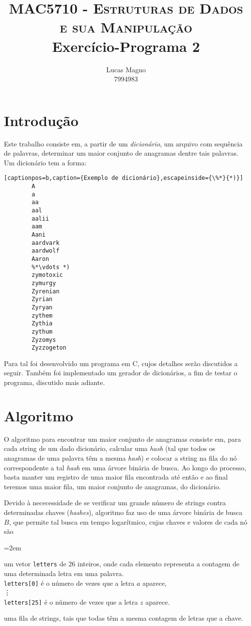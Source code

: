\documentclass[a4paper]{article}
\title{{\scshape\small MAC5710 - Estruturas de Dados e sua Manipulação} \\ Exercício-Programa 2}
\author{Lucas Magno \\ 7994983}
\date{}
\begin{document}
\maketitle

\section{Introdução}
    Este trabalho consiste em, a partir de um \emph{dicionário}, um arquivo com sequência de palavras, determinar um maior conjunto de anagramas dentre tais palavras. Um dicionário tem a forma:

    \begin{lstlisting}[captionpos=b,caption={Exemplo de dicionário},escapeinside={\%*}{*)}]
        A
        a
        aa
        aal
        aalii
        aam
        Aani
        aardvark
        aardwolf
        Aaron
        %*\vdots *)
        zymotoxic
        zymurgy
        Zyrenian
        Zyrian
        Zyryan
        zythem
        Zythia
        zythum
        Zyzomys
        Zyzzogeton
    \end{lstlisting}
    Para tal foi desenvolvido um programa em C, cujos detalhes serão discutidos a seguir. Também foi implementado um gerador de dicionários, a fim de testar o programa, discutido mais adiante.

\newpage
\section{Algoritmo}
    O algoritmo para encontrar um maior conjunto de anagramas consiste em, para cada string de um dado dicionário, calcular uma \emph{hash} (tal que todos os anagramas de uma palavra têm a mesma \emph{hash}) e colocar a string na fila do nó correspondente a tal \emph{hash} em uma árvore binária de busca. Ao longo do processo, basta manter um registro de uma maior fila encontrada até então e ao final teremos uma maior fila, um maior conjunto de anagramas, do dicionário.

    Devido à nececessidade de se verificar um grande número de strings contra determinadas chaves (\emph{hashes}), algoritmo faz uso de uma árvore binária de busca $B$, que permite tal busca em tempo logarítmico, cujas chaves e valores de cada nó são
    \begin{description}
        \leftskip=2em
        \item[Chave:] um vetor \texttt{letters} de 26 inteiros, onde cada elemento representa a contagem de uma determinada letra em uma palavra.\\
            \texttt{letters[0]} é o número de vezes que a letra $a$ aparece,\\
            \vdots\\
            \texttt{letters[25]} é o número de vezes que a letra $z$ aparece.

        \item[Valor:] uma fila de strings, tais que todas têm a mesma contagem de letras que a chave.
    \end{description}
\end{document}
